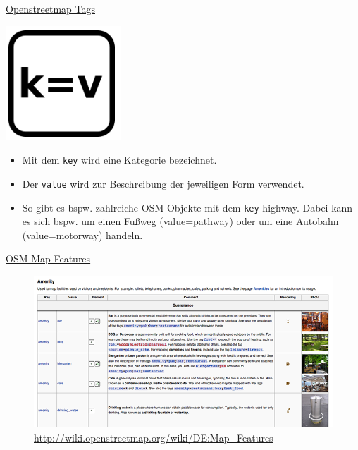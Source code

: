 \documentclass[ignorenonframetext,]{beamer}
\providecommand{\tightlist}{%
  \setlength{\itemsep}{0pt}\setlength{\parskip}{0pt}}
\begin{document}
\begin{frame}[fragile]{\href{https://wiki.openstreetmap.org/wiki/Tags}{Openstreetmap
Tags}}
\protect\hypertarget{openstreetmap-tags}{}

\includegraphics{figure/kv_scheme.PNG}

\begin{itemize}
\tightlist
\item
  Mit dem \texttt{key} wird eine Kategorie bezeichnet.
\item
  Der \texttt{value} wird zur Beschreibung der jeweiligen Form
  verwendet.
\item
  So gibt es bspw. zahlreiche OSM-Objekte mit dem \texttt{key} highway.
  Dabei kann es sich bspw. um einen Fußweg (value=pathway) oder um eine
  Autobahn (value=motorway) handeln.
\end{itemize}

\end{frame}

\begin{frame}{\href{http://wiki.openstreetmap.org/wiki/DE:Map_Features}{OSM
Map Features}}
\protect\hypertarget{osm-map-features}{}

\begin{figure}
\centering
\includegraphics{figure/osm_mapfeatures.png}
\caption{\url{http://wiki.openstreetmap.org/wiki/DE:Map_Features}}
\end{figure}

\end{frame}
\end{document}
